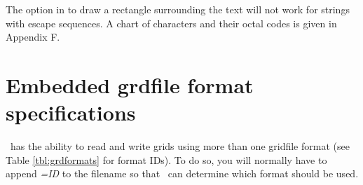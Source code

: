 The option in  to draw a rectangle surrounding the text
will not work for strings with escape sequences.  A chart of characters
and their octal codes is given in Appendix F. 

\section{Embedded grdfile format specifications}
\label{sec:grdformats}
\GMT\ has the ability to read and write grids using more than one gridfile
format (see Table \ref{tbl:grdformats} for format IDs).  To do so, you will normally have
to append {\it =ID} to the filename so that \GMT\ can determine which format
should be used.
